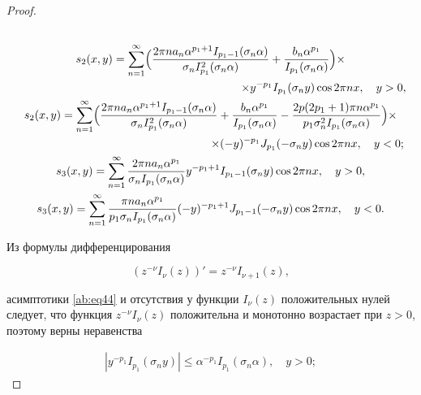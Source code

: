 \begin{proof}
\begin{gather}
\\

s_2(x,y)=\sum\limits_{n=1}^{\infty}\Bigl(\frac{2\pi na_n\alpha^{p_1+1}I_{p_1-1}(\sigma_n\alpha)}{\sigma_nI_{p_1}^2(\sigma_n\alpha)}+\frac{b_n\alpha^{p_1}}{I_{p_1}(\sigma_n\alpha)}\Bigr) \times \\

\hspace{7cm} \times y^{-p_1}I_{p_1}(\sigma_ny)\cos2\pi nx,\quad y>0,

\\

s_2(x,y)=\sum\limits_{n=1}^{\infty}\Bigl(\frac{2\pi na_n\alpha^{p_1+1}I_{p_1-1}(\sigma_n\alpha)}{\sigma_nI_{p_1}^2(\sigma_n\alpha)}+\frac{b_n\alpha^{p_1}}{I_{p_1}(\sigma_n\alpha)}-\frac{2p(2p_1+1)\pi n\alpha^{p_1}}{p_1\sigma_n^2I_{p_1}(\sigma_n\alpha)}\Bigr)\times\\

\hspace{6cm}\times(-y)^{-p_1}J_{p_1}(-\sigma_ny)\cos2\pi nx,\quad y<0;

\\

s_3(x,y)=\sum\limits_{n=1}^{\infty}\frac{2\pi na_n\alpha^{p_1}}{\sigma_nI_{p_1}(\sigma_n\alpha)}y^{-p_1+1}I_{p_1-1}(\sigma_n y)\cos2\pi nx,\quad y>0,

\\

s_3(x,y)=\sum\limits_{n=1}^{\infty}\frac{\pi na_n\alpha^{p_1}}{p_1\sigma_nI_{p_1}(\sigma_n\alpha)}(-y)^{-p_1+1}J_{p_1-1}(-\sigma_n y)\cos2\pi nx,\quad y<0.

\end{gather}



Из формулы дифференцирования \cite[c.~141]{ab:bib:Lebedev} 

$$

\left(z^{-\nu}I_{\nu}(z)\right)'=z^{-\nu}I_{\nu+1}(z),

$$

асимптотики \eqref{ab:eq44} и отсутствия у функции $I_{\nu}(z)$ положительных нулей \cite[c.~173]{ab:bib:Lebedev} следует, что функция $z^{-\nu}I_{\nu}(z)$ положительна и монотонно возрастает при $z>0$, поэтому верны неравенства 

\begin{gather}

\label{ab:eq30}

\left|y^{-p_1}I_{p_1}(\sigma_ny)\right|\le\alpha^{-p_1}I_{p_1}(\sigma_n\alpha),\quad y>0;


\end{gather}
\end{proof}
